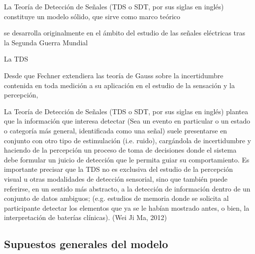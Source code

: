 La Teoría de Detección de Señales (TDS o SDT, por sus siglas en inglés) constituye un modelo sólido, que sirve como marco teórico  

se desarrolla originalmente en el ámbito del estudio de las señales eléctricas tras la Segunda Guerra Mundial 

La TDS 

Desde que Fechner extendiera las teoría de Gauss sobre la incertidumbre contenida en toda medición a su aplicación en el estudio de la sensación y la percepción, 


La Teoría de Detección de Señales (TDS o SDT, por sus siglas en inglés) plantea que la información que  interesa  detectar  (Sea un evento en particular o un estado o categoría más general, identificada como una señal)  suele  presentarse  en  conjunto  con  otro  tipo  de  estimulación (i.e. ruido),  cargándola  de  incertidumbre  y  haciendo de  la  percepción  un  proceso  de  toma  de decisiones  donde  el  sistema  debe  formular  un  juicio  de  detección que  le  permita  guiar  su comportamiento. Es importante precisar  que la TDS no es exclusiva del estudio de la percepción visual  u  otras  modalidades  de  detección  sensorial,  sino  que  también  puede  referirse,  en  un sentido más abstracto, a la detección de información dentro de un conjunto de datos ambiguos; (e.g.  estudios  de  memoria  donde  se  solicita  al  participante  detectar  los  elementos  que  ya  se  le habían mostrado antes, o bien, la interpretación de baterías clínicas). (Wei Ji Ma, 2012)\\

\subsection{Supuestos generales del modelo}

